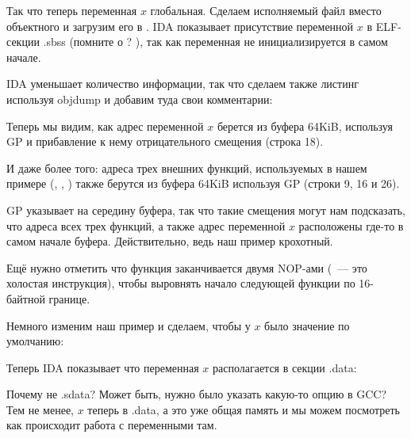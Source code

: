 

Так что теперь переменная $x$ глобальная.
Сделаем исполняемый файл вместо объектного и загрузим его в \IDA.
IDA показывает присутствие переменной $x$ в ELF-секции .sbss (помните о ? ),
так как переменная не инициализируется в самом начале.



IDA уменьшает количество информации, так что сделаем также листинг используя objdump и добавим туда свои комментарии:



Теперь мы видим, как адрес переменной $x$ берется из буфера 64KiB, используя GP и прибавление к нему отрицательного смещения (строка 18).

И даже более того: адреса трех внешних функций, используемых в нашем примере (\puts, \scanf, \printf)
также берутся из буфера 64KiB используя GP (строки 9, 16 и 26).

GP указывает на середину буфера, так что такие смещения могут нам подсказать, что адреса всех трех функций,
а также адрес переменной $x$ расположены где-то в самом начале буфера.
Действительно, ведь наш пример крохотный.

Ещё нужно отметить что функция заканчивается двумя \ac{NOP}-ами (~--- 
это холостая инструкция), чтобы выровнять начало следующей функции по 16-байтной границе.


Немного изменим наш пример и сделаем, чтобы у $x$ было значение по умолчанию:



Теперь IDA показывает что переменная $x$ располагается в секции .data:



Почему не .sdata? Может быть, нужно было указать какую-то опцию в GCC?
Тем не менее, $x$ теперь в .data, а это уже общая память и мы можем посмотреть как происходит
работа с переменными там.

